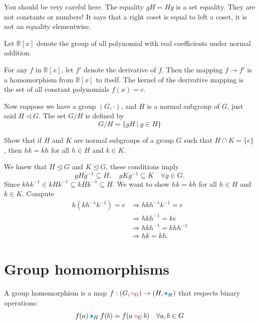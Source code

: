 You should be very careful here. The equality $gH = Hg$ is a set equality. They are not constants or numbers! It says that a 
right coset is equal to left a coset, it is not an equality elementwise.

\begin{example}
    Let $\mathbb{R}[x]$ denote the group of all polynomial with real coefficients under normal addition. 

    For any $f$ in $\mathbb{R}[x]$, let $f'$ denote the derivative of $f$. Then the mapping $f \to f'$ is a homomorphism from 
    $\mathbb{R}[x]$ to itself. The kernel of the derivative mapping is the set of all constant polynomials $f(x) = c$.
\end{example}

Now suppose we have a group $(G, \cdot)$, and $H$ is a normal subgroup of $G$, just said $H \vartriangleleft G$. The set $G/H$ is defined by 
\[
G/H = \{ gH \> | \> g \in H \}
\]

\begin{example}
    Show that if $H$ and $K$ are normal subgroups of a group $G$ such that $H \cap K = \{ e \}$, then 
    $hk = kh$ for all $h \in H$ and $k \in K$.
\end{example}
\begin{solution}
    We knew that $H \unlhd G$ and $K \unlhd G$, these conditions imply
    \[
        gHg^{-1} \subseteq H,\quad gKg^{-1} \subseteq K \quad \forall g \in G.
    \]
    Since $khk^{-1} \in kHk^{-1} \subseteq kHk^{-1}\subseteq H$. 
    We want to show $hk = kh$ for all $h \in H$ and $k \in K$. Compute 
    \begin{align*}
        h(kh^{-1}k^{-1}) = e &\Rightarrow hkh^{-1}k^{-1} = e\\
        &\Rightarrow hkh^{-1} = ke\\
        &\Rightarrow hkh^{-1} = khh^{-1}\\
        &\Rightarrow hk = kh.
    \end{align*}
\end{solution}

\section{Group homomorphisms}

\begin{definition}
    A group homomorphism is a map $f: (G,{\color{red} \diamond}_G) \to (H, {\color{cyan} \bullet}_H)$ that respects binary operations:
    \begin{equation}
        f(a) \> {\color{cyan} \bullet}_H \> f(b) = f(a \> {\color{red} \diamond}_G \> b) \quad \forall a, b \in G
    \end{equation}
\end{definition}

